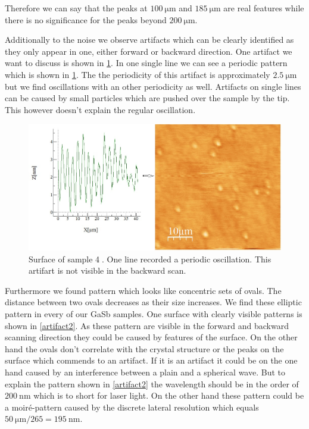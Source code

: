 \documentclass[paper=a4,fontsize=10pt,DIV=18,twocolumn,parskip=half]{scrartcl}
\numberwithin{equation}{section}    %
\begin{document}
Therefore we can say that the peaks at $\SI{100}{\micro\meter}$ and 
$\SI{185}{\micro\meter}$ are real features while there is no significance for 
the peaks beyond $\SI{200}{\micro\meter}$.

Additionally to the noise we observe artifacts which can be clearly identified 
as they only appear in one, either forward or backward direction. One artifact 
we want to discuss is shown in \cref{artifact1}. In one single line we can see a 
periodic pattern which is shown in \ref{artifact1}. The the periodicity of this 
artifact is approximately $\SI{2.5}{\micro\meter}$ but we find oscillations with 
an other periodicity as well. Artifacts on single lines can be caused by small 
particles which are pushed over the sample by the tip. This however doesn't 
explain the regular oscillation.

\begin{figure}
    \begin{center}
        \includegraphics[width=\columnwidth]{Bilder/artifact1}
        \caption{Surface of sample \textcircled{4}. One line recorded a periodic 
        oscillation. This artifart is not visible in the backward scan.}
        \label{artifact1}
    \end{center}
\end{figure}

Furthermore we found pattern which looks like concentric sets of ovals. The 
distance between two ovals decreases as their size increases. We find these 
elliptic pattern in every of our GaSb samples. One surface with clearly visible 
patterns is shown in \ref{artifact2}. As these pattern are visible in the forward 
and backward scanning direction they could be caused by features of the surface.
On the other hand the ovals don't correlate with the crystal structure or the
peaks on the surface which commends to an artifact. If it is an artifact it could
be on the one hand caused by an interference between a plain and a spherical wave. 
But to explain the pattern shown in \ref{artifact2} the wavelength should be in
the order of $\SI{200}{\nano\meter}$ which is to short for laser light.
On the other hand these pattern could be a moiré-pattern caused by the discrete
lateral resolution which equals $\SI{50}{\micro\meter}/265 = \SI{195}{\nano\meter}$.
\end{document}
